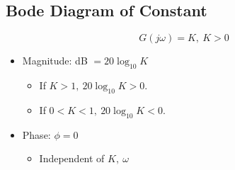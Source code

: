 \documentclass[a4paper]{article}
\begin{document}
\subsection{Bode Diagram of Constant}
$$G(j\omega) = K,\ K > 0$$
\begin{minipage}{0.35\textwidth}
\begin{itemize}
    \item Magnitude: dB $= 20\log_{10} K$
    \begin{itemize}[label=$\circ$]
        \item If $K > 1,\ 20\log_{10}K > 0$.
        \item If $0<K<1,\ 20\log_{10}K < 0$.
    \end{itemize}
    \item Phase: $\phi = 0$
    \begin{itemize}[label=$\circ$]
        \item Independent of $K,\ \omega$
    \end{itemize}
\end{itemize}
\end{minipage}
\end{document}
